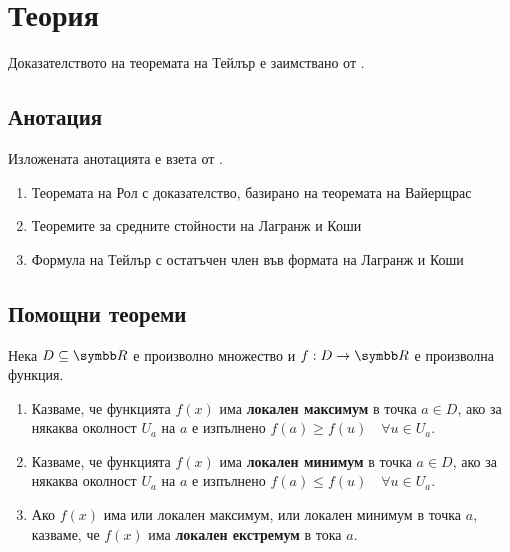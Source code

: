 \documentclass[
  headings=standardclasses,
  bibliography=totocnumbered,
]{scrartcl}
\title{\Title{5}}
\subtitle{Теореми за средните стойности (Рол, Лагранж и Коши). Формула на Тейлър.}
\author{Янис Василев}
\date{\Revision{6 юли 2019}}
\begin{document}
\maketitle

\section{Теория}

Доказателството на теоремата на Тейлър е заимствано от \cite{Fichtenholz}.

\subsection{Анотация}

Изложената анотацията е взета от \cite{Syllabus}.

\begin{enumerate}
  \item Теоремата на Рол с доказателство, базирано на теоремата на Вайерщрас
  \item Теоремите за средните стойности на Лагранж и Коши
  \item Формула на Тейлър с остатъчен член във формата на Лагранж и Коши
\end{enumerate}

\subsection{Помощни теореми}

\begin{definition}
  Нека \( D \subseteq \R \) е произволно множество и \( f: D \to \R \) е произволна функция.

  \begin{enumerate}
    \item Казваме, че функцията \( f(x) \) има \textbf{локален максимум} в точка \( a \in D \), ако за някаква околност \( U_a \) на \( a \) е изпълнено \( f(a) \geq f(u)\quad\forall u \in U_a \).

    \item Казваме, че функцията \( f(x) \) има \textbf{локален минимум} в точка \( a \in D \), ако за някаква околност \( U_a \) на \( a \) е изпълнено \( f(a) \leq f(u)\quad\forall u \in U_a \).

    \item Ако \( f(x) \) има или локален максимум, или локален минимум в точка \( a \), казваме, че \( f(x) \) има \textbf{локален екстремум} в тока \( a \).
  \end{enumerate}
\end{definition}
\end{document}
